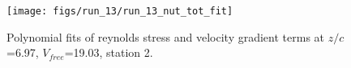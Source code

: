 \begin{figure}[H]
\centering
\texttt{[image: figs/run\_13/run\_13\_nut\_tot\_fit]}
\caption{Polynomial fits of reynolds stress and velocity gradient terms at $z/c$=6.97, $V_{free}$=19.03, station 2.}
\label{fig:run_13_nut_tot_fit}
\end{figure}


